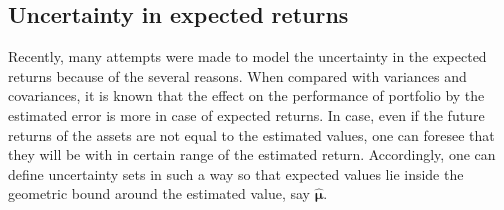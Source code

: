 \documentclass[a4paper,12pt,twoside]{article}
\begin{document}
\subsection{Uncertainty in expected returns}
Recently, many attempts were made to model the uncertainty in the expected returns because of the several reasons. When compared with variances and covariances, it is known that the effect on the performance of portfolio by the estimated error is more in case of expected returns. In case, even if the future returns of the assets are not equal to the estimated values, one can foresee that they will be with in certain range of the estimated return. Accordingly, one can define uncertainty sets in such a way so that expected values lie inside the geometric bound around the estimated value, say $\boldsymbol{\hat{\mu}}$.
\end{document}
